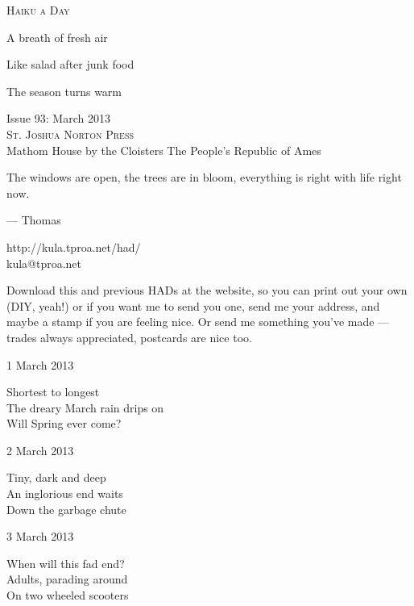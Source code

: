 \documentclass[12pt]{article}
\begin{document}
\begin{center}
{\fontsize{36}{48}\selectfont \textsc{Haiku a Day }}
\end{center}

\vspace*{3.5cm}

{\fontsize{20}{40}\selectfont 

A breath of fresh air

Like salad after junk food

The season turns warm

}

\vspace*{5.0cm}
\begin{center}
{\large{Issue 93: March 2013}} \\[5mm]
{\fontsize{8}{8}\selectfont  \textsc{ St. Joshua Norton Press }} \\[1mm]
{\fontsize{6}{6}\selectfont Mathom House by the Cloisters \textbar The People's Republic of Ames }
\end{center}


\newpage

The windows are open, the trees are in bloom, everything is right with 
life right now.

--- Thomas

http://kula.tproa.net/had/ \\
kula@tproa.net

Download this and previous HADs at the website, so you can
print out your own (DIY, yeah!) or if you want me to send
you one, send me your address, and maybe a stamp if you
are feeling nice. Or send me something you've made ---
trades always appreciated, postcards are nice too.

\vfill

1 March 2013

Shortest to longest \\
The dreary March rain drips on \\
Will Spring ever come? 

2 March 2013

Tiny, dark and deep \\
An inglorious end waits \\
Down the garbage chute

3 March 2013

When will this fad end? \\
Adults, parading around \\
On two wheeled scooters

\newpage
\end{document}
